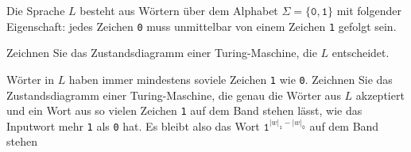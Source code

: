 Die Sprache $L$ besteht aus Wörtern über dem Alphabet
$\Sigma=\{\texttt{0},\texttt{1}\}$ mit folgender Eigenschaft:
jedes Zeichen \texttt{0} muss unmittelbar von einem Zeichen \texttt{1}
gefolgt sein.


\begin{teilaufgaben}
\item
Zeichnen Sie das Zustandsdiagramm einer Turing-Maschine, die $L$ entscheidet.
\item
Wörter in $L$ haben immer mindestens soviele Zeichen \texttt{1} wie \texttt{0}.
Zeichnen Sie das Zustandsdiagramm einer Turing-Maschine, die genau die
Wörter aus $L$ akzeptiert und ein Wort aus so vielen Zeichen \texttt{1}
auf dem Band stehen lässt, wie das Inputwort mehr \texttt{1} als \texttt{0}
hat.
Es bleibt also das Wort
$\texttt{1}^{|w|_\texttt{1}-|w|_\texttt{0}}$ auf dem Band stehen
\end{teilaufgaben}

